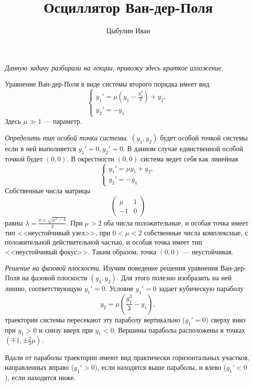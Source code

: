 \documentclass[12pt]{article}
\author{Цыбулин Иван}
\title{Осциллятор Ван-дер-Поля}
\date{}
\begin{document}
\maketitle

\emph{Данную задачу разбирали на лекции, привожу здесь краткое изложение.}

Уравнение Ван-дер-Поля в виде системы второго порядка имеет вид
\[
\begin{cases}
y_1' = \mu\left(y_1 - \frac{y_1^3}{3}\right) + y_2,\\
y_2' = -y_1
\end{cases}
\]
Здесь $\mu \gg 1$ --- параметр. 

\emph{Определить тип особой точки системы}. $(y_1, y_2)$ будет особой точкой системы если в ней выполняется $y_1'=0, y_2'=0$. В данном случае единственной особой точкой будет $(0, 0)$. В окрестности $(0, 0)$ система ведет себя как линейная
\[
\begin{cases}
y_1' = \mu y_1 + y_2,\\
y_2' = -y_1
\end{cases}
\]
Собственные числа матрицы 
$$
\begin{pmatrix}
\mu & 1\\
-1 & 0
\end{pmatrix}
$$
равны $\lambda = \frac{\mu \pm \sqrt{\mu^2 - 4}}{2}$. При $\mu > 2$ оба числа положительные, и особая точка имеет тип <<неустойчивый узел>>, при $0 < \mu < 2$ собственные числа комплексные, с положительной действительной частью, и особая точка имеет тип <<неустойчивый фокус>>. Таким образом, точка $(0, 0)$ --- неустойчивая.

\emph{Решение на фазовой плоскости}. Изучим поведение решения уравнения Ван-дер-Поля на фазовой плоскости $(y_1, y_2)$. Для этого полезно изобразить на ней линию, соответствующую
$y_1' = 0$. Условие $y_1' = 0$ задает кубическую параболу
\[
y_2 = \mu \left(\frac{y_1^3}{3} - y_1\right),
\]
траектории системы пересекают эту параболу вертикально ($y_1' = 0$) сверху вниз при $y_1 > 0$ и снизу вверх при $y_1 < 0$. Вершины параболы расположены в точках $(\mp 1, \pm \frac{2}{3}\mu)$.

Вдали от параболы траектории имеют вид практически горизонтальных участков, направленных вправо ($y_1' > 0$), если находятся выше параболы, и влево ($y_1' < 0$), если находятся ниже.
\end{document}
